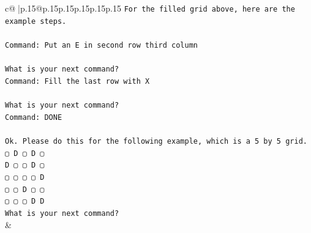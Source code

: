 \documentclass{article}
\begin{document}
{\begin{supertabular}{c@{$\;$}|p{.15\linewidth}@{}p{.15\linewidth}p{.15\linewidth}p{.15\linewidth}p{.15\linewidth}p{.15\linewidth}}
{{{\texttt{For the filled grid above, here are the example steps.} \\
\\ 
\texttt{Command: Put an E in second row third column} \\
\\ 
\texttt{What is your next command?} \\
\texttt{Command: Fill the last row with X} \\
\\ 
\texttt{What is your next command?} \\
\texttt{Command: DONE} \\
\\ 
\texttt{Ok. Please do this for the following example, which is a 5 by 5 grid.} \\
\texttt{▢ D ▢ D ▢} \\
\texttt{D ▢ ▢ D ▢} \\
\texttt{▢ ▢ ▢ ▢ D} \\
\texttt{▢ ▢ D ▢ ▢} \\
\texttt{▢ ▢ ▢ D D} \\
\texttt{What is your next command?} \\
            }
        }
    }
    & \\ \\


\end{supertabular}}
\end{document}

